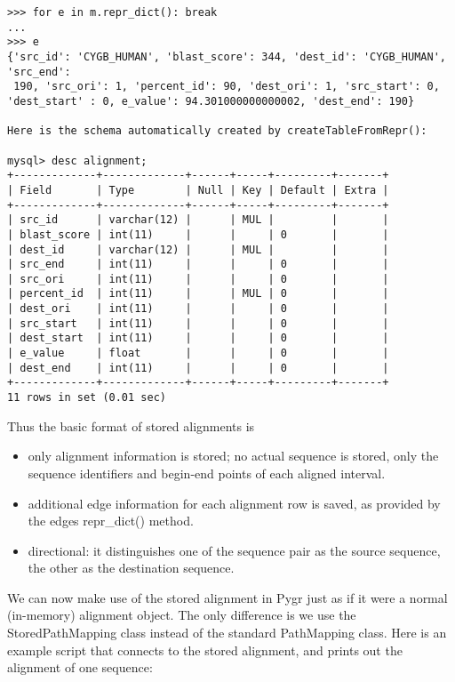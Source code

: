 \documentclass{howto}
\begin{document}
\begin{verbatim}
>>> for e in m.repr_dict(): break
... 
>>> e
{'src_id': 'CYGB_HUMAN', 'blast_score': 344, 'dest_id': 'CYGB_HUMAN', 'src_end':
 190, 'src_ori': 1, 'percent_id': 90, 'dest_ori': 1, 'src_start': 0, 'dest_start' : 0, e_value': 94.301000000000002, 'dest_end': 190}

Here is the schema automatically created by createTableFromRepr():

mysql> desc alignment;
+-------------+-------------+------+-----+---------+-------+
| Field       | Type        | Null | Key | Default | Extra |
+-------------+-------------+------+-----+---------+-------+
| src_id      | varchar(12) |      | MUL |         |       |
| blast_score | int(11)     |      |     | 0       |       |
| dest_id     | varchar(12) |      | MUL |         |       |
| src_end     | int(11)     |      |     | 0       |       |
| src_ori     | int(11)     |      |     | 0       |       |
| percent_id  | int(11)     |      | MUL | 0       |       |
| dest_ori    | int(11)     |      |     | 0       |       |
| src_start   | int(11)     |      |     | 0       |       |
| dest_start  | int(11)     |      |     | 0       |       |
| e_value     | float       |      |     | 0       |       |
| dest_end    | int(11)     |      |     | 0       |       |
+-------------+-------------+------+-----+---------+-------+
11 rows in set (0.01 sec)
\end{verbatim}

Thus the basic format of stored alignments is

\begin{itemize}

\item
only alignment information is stored; no actual sequence is stored, only the sequence identifiers and begin-end points of each aligned interval.

\item
additional edge information for each alignment row is saved, as provided by the edges repr_dict() method.

\item
directional: it distinguishes one of the sequence pair as the source sequence, the other as the destination sequence.

\end{itemize}

We can now make use of the stored alignment in Pygr just as if it were a normal (in-memory) alignment object.  The only difference is we use the StoredPathMapping class instead of the standard PathMapping class.  Here is an example script that connects to the stored alignment, and prints out the alignment of one sequence:
\end{document}
